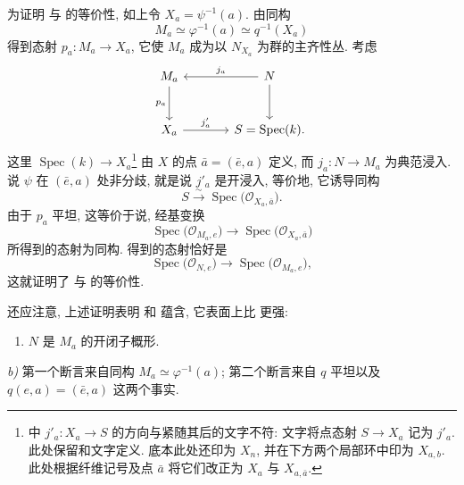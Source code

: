 为证明  与  的等价性, 如上令 \(X_a=\psi^{-1}(a)\). 由同构
\[
  M_a\simeq\varphi^{-1}(a)\simeq q^{-1}(X_a)
\]
得到态射 \(p_a:M_a\to X_a\), 它使 \(M_a\) 成为以 \(N_{X_a}\) 为群的主齐性丛. 考虑
\[
\begin{tikzcd}[column sep=large,row sep=large]
M_a \arrow[d,"p_a"'] &
N \arrow[l,"j_a"'] \arrow[d] \\
X_a \arrow[r,"j'_a"] &
S=\operatorname{Spec}(k).
\end{tikzcd}
\]
这里 \(\operatorname{Spec}(k)\to X_a\)\footnote{中 \(j'_a:X_a\to S\) 的方向与紧随其后的文字不符: 文字将点态射 \(S\to X_a\) 记为 \(j'_a\). 此处保留和文字定义. 底本此处还印为 \(X_n\), 并在下方两个局部环中印为 \(X_{a,b}\). 此处根据纤维记号及点 \(\bar a\) 将它们改正为 \(X_a\) 与 \(X_{a,\bar a}\).} 由 \(X\) 的点 \(\bar a=(\bar e,a)\) 定义, 而 \(j_a:N\to M_a\) 为典范浸入. 说 \(\psi\) 在 \((\bar e,a)\) 处非分歧, 就是说 \(j'_a\) 是开浸入, 等价地, 它诱导同构
\[
  S\xrightarrow{\sim}\operatorname{Spec}
  \bigl(\mathcal O_{X_a,\bar a}\bigr).
\]
由于 \(p_a\) 平坦, 这等价于说, 经基变换
\[
  \operatorname{Spec}\bigl(\mathcal O_{M_a,e}\bigr)
  \longrightarrow
  \operatorname{Spec}\bigl(\mathcal O_{X_a,\bar a}\bigr)
\]
所得到的态射为同构. 得到的态射恰好是
\[
  \operatorname{Spec}\bigl(\mathcal O_{N,e}\bigr)
  \longrightarrow
  \operatorname{Spec}\bigl(\mathcal O_{M_a,e}\bigr),
\]
这就证明了  与  的等价性.

还应注意, 上述证明表明  和  蕴含, 它表面上比  更强:
\begin{enumerate}
\item[(iii bis)] 
  \(N\) 是 \(M_a\) 的开闭子概形.
\end{enumerate}

\textit{b)} 第一个断言来自同构 \(M_a\simeq\varphi^{-1}(a)\); 第二个断言来自 \(q\) 平坦以及 \(q(e,a)=(\bar e,a)\) 这两个事实.

